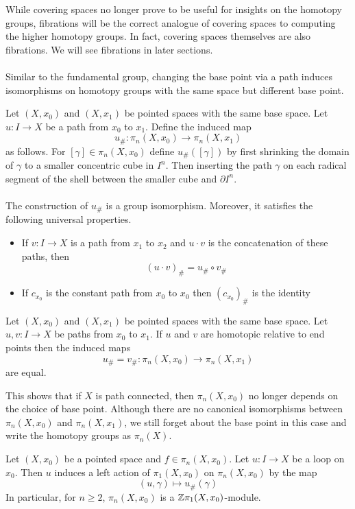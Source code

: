 \documentclass[a4paper]{article}
\begin{document}
While covering spaces no longer prove to be useful for insights on the homotopy groups, fibrations will be the correct analogue of covering spaces to computing the higher homotopy groups. In fact, covering spaces themselves are also fibrations. We will see fibrations in later sections. \\~\\

Similar to the fundamental group, changing the base point via a path induces isomorphisms on homotopy groups with the same space but different base point. 

\begin{thm}{}{} Let $(X,x_0)$ and $(X,x_1)$ be pointed spaces with the same base space. Let $u:I\to X$ be a path from $x_0$ to $x_1$. Define the induced map $$u_\#:\pi_n(X,x_0)\to\pi_n(X,x_1)$$ as follows. For $[\gamma]\in\pi_n(X,x_0)$ define $u_\#([\gamma])$ by first shrinking the domain of $\gamma$ to a smaller concentric cube in $I^n$. Then inserting the path $\gamma$ on each radical segment of the shell between the smaller cube and $\partial I^n$. \\~\\
The construction of $u_\#$ is a group isomorphism. Moreover, it satisfies the following universal properties. 
\begin{itemize}
\item If $v:I\to X$ is a path from $x_1$ to $x_2$ and $u\cdot v$ is the concatenation of these paths, then $$(u\cdot v)_\#=u_\#\circ v_\#$$
\item If $c_{x_0}$ is the constant path from $x_0$ to $x_0$ then $(c_{x_0})_\#$ is the identity
\end{itemize}
\end{thm}

\begin{prp}{}{} Let $(X,x_0)$ and $(X,x_1)$ be pointed spaces with the same base space. Let $u,v:I\to X$ be paths from $x_0$ to $x_1$. If $u$ and $v$ are homotopic relative to end points then the induced maps $$u_\#=v_\#:\pi_n(X,x_0)\to\pi_n(X,x_1)$$ are equal. 
\end{prp}

This shows that if $X$ is path connected, then $\pi_n(X,x_0)$ no longer depends on the choice of base point. Although there are no canonical isomorphisms between $\pi_n(X,x_0)$ and $\pi_n(X,x_1)$, we still forget about the base point in this case and write the homotopy groups as $\pi_n(X)$. 

\begin{prp}{}{} Let $(X,x_0)$ be a pointed space and $f\in\pi_n(X,x_0)$. Let $u:I\to X$ be a loop on $x_0$. Then $u$ induces a left action of $\pi_1(X,x_0)$ on $\pi_n(X,x_0)$ by the map $$(u,\gamma)\mapsto u_\#(\gamma)$$ In particular, for $n\geq 2$, $\pi_n(X,x_0)$ is a $\mathbb{Z}\pi_1(X,x_0)$-module. 
\end{prp}
\end{document}

